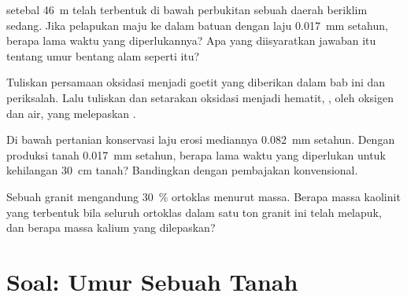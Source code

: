 \begin{exercise}[$\star\star\star$]\label{exo:g10:soil-formation:12}
 setebal \qty{46}{m} telah terbentuk di bawah perbukitan sebuah
daerah beriklim sedang. Jika pelapukan maju ke dalam batuan dengan laju
\qty{0.017}{mm} setahun, berapa lama waktu yang diperlukannya? Apa yang
diisyaratkan jawaban itu tentang umur bentang alam seperti itu?
\end{exercise}

\begin{exercise}[$\star\star\star$]\label{exo:g10:soil-formation:13}
Tuliskan persamaan oksidasi  menjadi goetit yang diberikan dalam bab
ini dan periksalah. Lalu tuliskan dan setarakan oksidasi  menjadi
hematit, , oleh oksigen dan air, yang melepaskan .
\end{exercise}

\begin{exercise}[$\star\star\star$]\label{exo:g10:soil-formation:14}
Di bawah pertanian konservasi laju erosi mediannya \qty{0.082}{mm} setahun.
Dengan produksi tanah \qty{0.017}{mm} setahun, berapa lama waktu yang
diperlukan untuk kehilangan \qty{30}{cm} tanah? Bandingkan dengan pembajakan
konvensional.
\end{exercise}

\begin{exercise}[$\star\star\star$]\label{exo:g10:soil-formation:15}
Sebuah granit mengandung \qty{30}{\percent} ortoklas menurut massa. Berapa
massa kaolinit yang terbentuk bila seluruh ortoklas dalam satu ton granit ini
telah melapuk, dan berapa massa kalium yang dilepaskan?
\end{exercise}

\section{Soal: Umur Sebuah Tanah}

